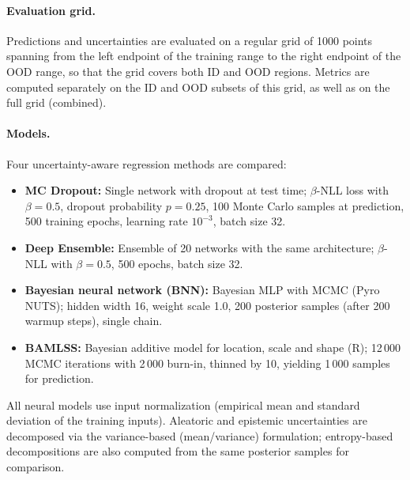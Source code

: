 \paragraph{Evaluation grid.}
Predictions and uncertainties are evaluated on a regular grid of 1000 points spanning from the left endpoint of the training range to the right endpoint of the OOD range, so that the grid covers both ID and OOD regions. Metrics are computed separately on the ID and OOD subsets of this grid, as well as on the full grid (combined).

\paragraph{Models.}
Four uncertainty-aware regression methods are compared:
\begin{itemize}
  \item \textbf{MC Dropout:} Single network with dropout at test time; $\beta$-NLL loss with $\beta = 0.5$, dropout probability $p = 0.25$, 100 Monte Carlo samples at prediction, 500 training epochs, learning rate $10^{-3}$, batch size 32.
  \item \textbf{Deep Ensemble:} Ensemble of 20 networks with the same architecture; $\beta$-NLL with $\beta = 0.5$, 500 epochs, batch size 32.
  \item \textbf{Bayesian neural network (BNN):} Bayesian MLP with MCMC (Pyro NUTS); hidden width 16, weight scale 1.0, 200 posterior samples (after 200 warmup steps), single chain.
  \item \textbf{BAMLSS:} Bayesian additive model for location, scale and shape (R); 12\,000 MCMC iterations with 2\,000 burn-in, thinned by 10, yielding 1\,000 samples for prediction.
\end{itemize}
All neural models use input normalization (empirical mean and standard deviation of the training inputs). Aleatoric and epistemic uncertainties are decomposed via the variance-based (mean/variance) formulation; entropy-based decompositions are also computed from the same posterior samples for comparison.

